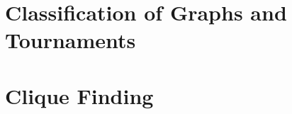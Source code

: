 \clearpage

\section{Classification of Graphs and Tournaments}
\label{sec:graphtheory:classification}






\bigskip


\clearpage


\section{Clique Finding}
\label{sec:graphtheory:cliques}






\bigskip


\clearpage

